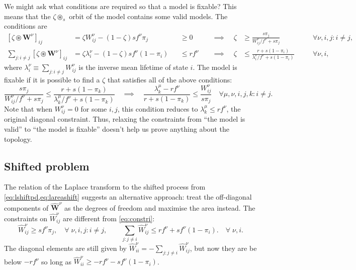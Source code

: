 \documentclass[12pt]{article}
\newcommand{\eqm}{\pi}
\newcommand{\lbm}{\lambda}
\newcommand{\Wm}{W}
\newcommand{\W}{\mathbf{\Wm}}
\newcommand{\shift}[1]{\widehat{#1}}
\begin{document}
We might ask what conditions are required so that a model is fixable?
This means that the \(\zeta \circledast_s \) orbit of the model contains some valid models.
The conditions are
%
\begin{equation*}
\begin{alignedat}{5}
  [\zeta \circledast \W^\nu]_{ij}  
    &= \zeta \Wm^\nu_{ij} - (1-\zeta) s f^\nu \eqm_j 
    &&\geq 0 &
  \;\; &\implies \;\; &
  \zeta &\geq \frac{s \eqm_j}{\Wm^\nu_{ij} /  f^\nu + s \eqm_j} &
    &\forall \nu, i, j : i \neq j , \\
  \sum_{j : i \neq j} [\zeta \circledast \W^\nu]_{ij} 
    &= \zeta \lbm^\nu_i - (1-\zeta) s f^\nu (1-\eqm_i) 
    &&\leq r f^\nu &
  &\implies &
  \zeta &\leq \frac{r + s (1-\eqm_i)}{\lbm^\nu_i / f^\nu + s (1-\eqm_i)} &
    \quad &\forall \nu, i ,
\end{alignedat}
\end{equation*}
%
where \(\lbm^\nu_i \equiv \sum_{j : i \neq j} \Wm^\nu_{ij}\) is the inverse mean  lifetime of state \(i\).
The model is fixable if it is possible to find a \(\zeta\) that satisfies all of the above conditions:
%
\begin{equation}\label{eq:fixable}
  \frac{s \eqm_j}{\Wm^\nu_{ij} / f^\nu + s \eqm_j} \leq \frac{r + s (1-\eqm_k)}{\lbm^\mu_k / f^\nu + s (1-\eqm_k)}
  \quad \implies \quad
  \frac{\lbm^\mu_k - r f^\nu}{r + s (1-\eqm_k)} \leq \frac{\Wm^\nu_{ij}}{s \eqm_j} 
  \quad \forall \mu, \nu, i, j, k : i \neq j.
\end{equation}
%
Note that when \(\Wm^\nu_{ij} = 0\) for some \(i,j \), this condition reduces to \(\lbm^\mu_k \leq r f^\nu\), the original diagonal constraint.
Thus, relaxing the constraints from ``the model is valid'' to ``the model is fixable'' doesn't help us prove anything about the topology.



\subsection{Shifted problem}\label{sec:lshift}

The relation of the Laplace transform to the shifted process from \cref{eq:lshiftpd,eq:lareashift} suggests an alternative approach: 
treat the off-diagonal components of \(\shift{\W}^\nu \) as the degrees of freedom and maximise the area instead.
The constraints on \(\shift{\Wm}^\nu_{ij}\) are different from \cref{eq:constri}:
%
\begin{equation}\label{eq:lshiftconstr}
  \shift{\Wm}^\nu_{ij} \geq s f^\nu \eqm_j,
    \quad \forall \; \nu, i, j : i \neq j, \qquad
  \sum_{j: j \neq i} \shift{\Wm}^\nu_{ij} \leq r f^\nu + s f^\nu (1 - \eqm_i).
    \quad \forall \; \nu, i.
\end{equation}
%
The diagonal elements are still given by \( \shift{\Wm}^\nu_{ii} = - \sum_{j: j \neq i} \shift{\Wm}^\nu_{ij} \), but now they are be below \(-r f^\nu \) so long as \(\shift{\Wm}^\nu_{ii} \geq -r f^\nu - s f^\nu (1 - \eqm_i)\).
\end{document}
